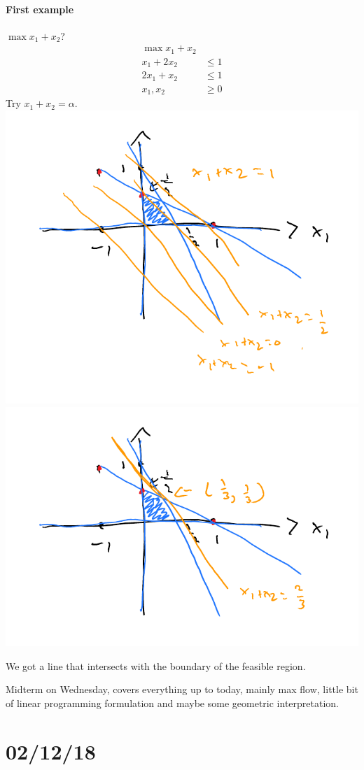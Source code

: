 \documentclass[12 pt]{article}
\begin{document}
        \paragraph{First example} $\max x_1 + x_2$?
        \begin{align*}
          \max x_1+x_2
          \\ x_1 + 2x_2  & \leq 1
          \\ 2x_1 + x_2 & \leq 1
          \\ x_1, x_2 & \geq 0
        \end{align*}
        Try $x_1 + x_2 = \alpha$.
        \\
        \includegraphics[width=.7\textwidth]{i102.pdf}
        \\ \includegraphics[width=.7\textwidth]{i103.pdf}

        We got a line that intersects with the boundary of the
        feasible region.
        
        Midterm on Wednesday, covers everything up to today, mainly
        max flow, little bit of linear programming formulation and
        maybe some geometric interpretation.
        \section{02/12/18}
\end{document}
